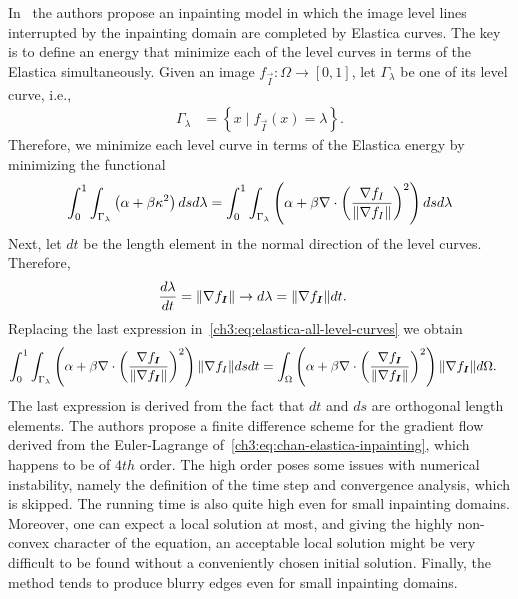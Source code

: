 In~\cite{chan02elasticainpainting} the authors propose an inpainting model in which the image level lines interrupted by the inpainting domain are completed by Elastica curves. The key is to define an energy that minimize each of the level curves in terms of the Elastica simultaneously. Given an image $f_{\vec{I}}:\Omega \rightarrow [0,1]$, let $\Gamma_{\lambda}$ be one of its level curve, i.e.,
\begin{align*}
	\Gamma_{\lambda} &= \left\{ x \; | \; f_{\vec{I}}(x)=\lambda \right\}.
\end{align*}
%
Therefore, we minimize each level curve in terms of the Elastica energy by minimizing the functional
\begin{align}
	\int_{0}^{1}{ \int_{\Gamma_{\lambda}}{ \left( \alpha + \beta \kappa ^2 \right) dsd\lambda}} = \int_{0}^{1}{ \int_{\Gamma_{\lambda}}{ \left(\alpha + \beta \nabla \cdot \left(\frac{\nabla f_I}{\lVert\nabla f_I\rVert}\right) ^2 \right) dsd\lambda}}
	\label{ch3:eq:elastica-all-level-curves}
\end{align}
%
Next, let $dt$ be the length element in the normal direction of the level curves. Therefore,
\begin{align*}
	\frac{d \lambda}{d t} &= \lVert\nabla f_{\bm{I}}\rVert \rightarrow d\lambda = \lVert\nabla f_{\bm{I}}\rVert dt.
\end{align*}
%
Replacing the last expression in~\cref{ch3:eq:elastica-all-level-curves} we obtain
\begin{align}
	\int_{0}^{1}{ \int_{\Gamma_{\lambda}}{ \left(\alpha + \beta \nabla \cdot \left(\frac{\nabla f_{\bm{I}}}{\lVert\nabla f_{\bm{I}} \rVert}\right) ^2 \right)\lVert\nabla f_I\rVert dsdt}} &= \int_{\Omega}{ \left(\alpha + \beta \nabla \cdot \left(\frac{\nabla f_{\bm{I}}}{\lVert\nabla f_{\bm{I}} \rVert}\right) ^2 \right)\lVert\nabla f_{\bm{I}} \rVert d\Omega}.
	\label{ch3:eq:chan-elastica-inpainting}
\end{align}
%
The last expression is derived from the fact that $dt$ and $ds$ are orthogonal length elements. The authors propose a finite difference scheme for the gradient flow derived from the Euler-Lagrange of~\cref{ch3:eq:chan-elastica-inpainting}, which happens to be of $4th$ order. The high order poses some issues with numerical instability, namely the definition of the time step and convergence analysis, which is skipped. The running time is also quite high even for small inpainting domains. Moreover, one can expect a local solution at most, and giving the highly non-convex character of the equation, an acceptable local solution might be very difficult to be found without a conveniently chosen initial solution. Finally, the  method tends to produce blurry edges even for small inpainting domains. 

